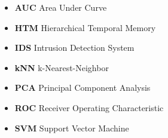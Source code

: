 \begin{abbreviations}
  \label{abbreviations}
  \begin{itemize}[leftmargin=*]
    \item[] \textbf{AUC} Area Under Curve
    \item[] \textbf{HTM} Hierarchical Temporal Memory
    \item[] \textbf{IDS} Intrusion Detection System
    \item[] \textbf{kNN} k-Nearest-Neighbor
    \item[] \textbf{PCA} Principal Component Analysis
    \item[] \textbf{ROC} Receiver Operating Characteristic
    \item[] \textbf{SVM} Support Vector Machine
  \end{itemize}
\end{abbreviations}